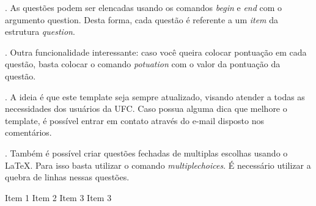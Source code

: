 \documentclass[11pt, a4paper, answers]{exam}
\begin{document}
    \makeheader
    
    \vspace{1cm}
    
    \begin{question}
        \item {}. As questões podem ser elencadas usando os comandos \textit{begin} e \textit{end} com o argumento question. Desta forma, cada questão é referente a um \textit{item} da estrutura \textit{question}.

        \item {}. Outra funcionalidade interessante: caso você queira colocar pontuação em cada questão, basta colocar o comando \textit{potuation} com o valor da pontuação da questão. 
        
        \item {}. A ideia é que este template seja sempre atualizado, visando atender a todas as necessidades dos usuários da UFC. Caso possua alguma dica que melhore o template, é possível entrar em contato através do e-mail disposto nos comentários.
        
        \item {}. Também é possível criar questões fechadas de multiplas escolhas usando o \LaTeX. Para isso basta utilizar o comando \textit{multiplechoices}. É necessário utilizar a quebra de linhas nessas questões. \\
        \begin{multiplechoices}
            \choice Item 1
            \choice Item 2
            \choice Item 3
            \choice Item 3
        \end{multiplechoices}
    \end{question}
\end{document}
